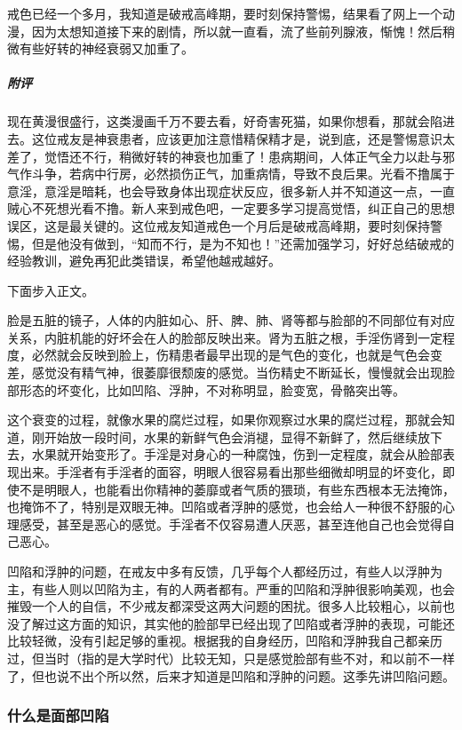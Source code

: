 \begin{case}
    戒色已经一个多月，我知道是破戒高峰期，要时刻保持警惕，结果看了网上一个动漫，因为太想知道接下来的剧情，所以就一直看，流了些前列腺液，惭愧！然后稍微有些好转的神经衰弱又加重了。
    \subparagraph{附评} 现在黄漫很盛行，这类漫画千万不要去看，好奇害死猫，如果你想看，那就会陷进去。这位戒友是神衰患者，应该更加注意惜精保精才是，说到底，还是警惕意识太差了，觉悟还不行，稍微好转的神衰也加重了！患病期间，人体正气全力以赴与邪气作斗争，若病中行房，必然损伤正气，加重病情，导致不良后果。光看不撸属于意淫，意淫是暗耗，也会导致身体出现症状反应，很多新人并不知道这一点，一直贼心不死想光看不撸。新人来到戒色吧，一定要多学习提高觉悟，纠正自己的思想误区，这是最关键的。这位戒友知道戒色一个月后是破戒高峰期，要时刻保持警惕，但是他没有做到，“知而不行，是为不知也！”还需加强学习，好好总结破戒的经验教训，避免再犯此类错误，希望他越戒越好。
\end{case}

下面步入正文。

脸是五脏的镜子，人体的内脏如心、肝、脾、肺、肾等都与脸部的不同部位有对应关系，内脏机能的好坏会在人的脸部反映出来。肾为五脏之根，手淫伤肾到一定程度，必然就会反映到脸上，伤精患者最早出现的是气色的变化，也就是气色会变差，感觉没有精气神，很萎靡很颓废的感觉。当伤精史不断延长，慢慢就会出现脸部形态的坏变化，比如凹陷、浮肿，不对称明显，脸变宽，骨骼突出等。

这个衰变的过程，就像水果的腐烂过程，如果你观察过水果的腐烂过程，那就会知道，刚开始放一段时间，水果的新鲜气色会消褪，显得不新鲜了，然后继续放下去，水果就开始变形了。手淫是对身心的一种腐蚀，伤到一定程度，就会从脸部表现出来。手淫者有手淫者的面容，明眼人很容易看出那些细微却明显的坏变化，即使不是明眼人，也能看出你精神的萎靡或者气质的猥琐，有些东西根本无法掩饰，也掩饰不了，特别是双眼无神。凹陷或者浮肿的感觉，也会给人一种很不舒服的心理感受，甚至是恶心的感觉。手淫者不仅容易遭人厌恶，甚至连他自己也会觉得自己恶心。

凹陷和浮肿的问题，在戒友中多有反馈，几乎每个人都经历过，有些人以浮肿为主，有些人则以凹陷为主，有的人两者都有。严重的凹陷和浮肿很影响美观，也会摧毁一个人的自信，不少戒友都深受这两大问题的困扰。很多人比较粗心，以前也没了解过这方面的知识，其实他的脸部早已经出现了凹陷或者浮肿的表现，可能还比较轻微，没有引起足够的重视。根据我的自身经历，凹陷和浮肿我自己都亲历过，但当时（指的是大学时代）比较无知，只是感觉脸部有些不对，和以前不一样了，但也说不出个所以然，后来才知道是凹陷和浮肿的问题。这季先讲凹陷问题。

\subsubsection{什么是面部凹陷}

